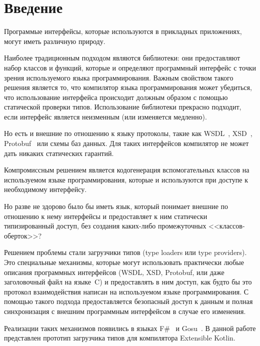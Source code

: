 \clearpage
\section*{Введение}

Программые интерфейсы, которые используются в прикладных приложениях, могут иметь различную природу.

Наиболее традиционным подходом являются библиотеки: они предоставляют набор классов и функций, которые и определяют программный интерфейс с точки зрения используемого языка программирования.
Важным свойством такого решения является то, что компилятор языка программирования может убедиться, что использование интерфейса происходит должным образом с помощью статической проверки типов. Использование библиотеки прекрасно подходит, если интерфейс является неизменным (или изменяется медленно).

Но есть и внешние по отношению к языку протоколы, такие как WSDL~\cite{wsdl}, XSD~\cite{xsd1, xsd2}, Protobuf~\cite{protobuf} или схемы баз данных. Для таких интерфейсов компилятор не может дать никаких статических гарантий.

Компромиссным решением является кодогенерация вспомогательных классов на используемом языке программирования, которые и используются при доступе к необходимому интерфейсу.

Но разве не здорово было бы иметь язык, который понимает внешние по отношению к нему интерфейсы и предоставляет к ним статически типизированный доступ, без создания каких-либо промежуточных <<классов-оберток>>?

Решением проблемы стали загрузчики типов (type loaders или type providers). Это специальные механизмы, которые могут использовать практически любые описания программных интерфейсов
(WSDL, XSD, Protobuf, или даже заголовочный файл на языке~C) и предоставлять в ним доступ, как будто бы это протокол взаимодействия написан на используемом языке программирования.
С помощью такого подхода предоставляется безопасный доступ к данным и полная синхронизация с внешним программным интерфейсом в случае его изменения.

Реализации таких механизмов появились в языках F\#~\cite{fsharp2010expert} и Gosu~\cite{gosuguide}. В данной работе представлен прототип загрузчика типов для компилятора Extensible Kotlin.

\clearpage